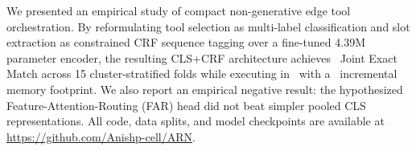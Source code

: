 \documentclass[letterpaper]{article}
\begin{document}
We presented an empirical study of compact non-generative edge tool orchestration. By reformulating tool selection as multi-label classification and slot extraction as constrained CRF sequence tagging over a fine-tuned 4.39M parameter encoder, the resulting CLS+CRF architecture achieves \PrimaryJointEM\ Joint Exact Match across 15 cluster-stratified folds while executing in \ONNXINTFourTLatencyMean\ with a \IsolatedIncrRSS\ incremental memory footprint. We also report an empirical negative result: the hypothesized Feature-Attention-Routing (FAR) head did not beat simpler pooled CLS representations. All code, data splits, and model checkpoints are available at \url{https://github.com/Anishp-cell/ARN}.


\end{document}
